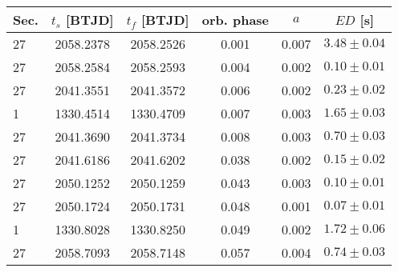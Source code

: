 \begin{tabular}{l|ccccc}
\hline
 Sec. &  $t_s$ [BTJD] &  $t_f$ [BTJD] &  orb. phase &    $a$ &         $ED$ [s] \\
\hline
   27 &     2058.2378 &     2058.2526 &       0.001 &  0.007 &  $3.48 \pm 0.04$ \\
   27 &     2058.2584 &     2058.2593 &       0.004 &  0.002 &  $0.10 \pm 0.01$ \\
   27 &     2041.3551 &     2041.3572 &       0.006 &  0.002 &  $0.23 \pm 0.02$ \\
    1 &     1330.4514 &     1330.4709 &       0.007 &  0.003 &  $1.65 \pm 0.03$ \\
   27 &     2041.3690 &     2041.3734 &       0.008 &  0.003 &  $0.70 \pm 0.03$ \\
   27 &     2041.6186 &     2041.6202 &       0.038 &  0.002 &  $0.15 \pm 0.02$ \\
   27 &     2050.1252 &     2050.1259 &       0.043 &  0.003 &  $0.10 \pm 0.01$ \\
   27 &     2050.1724 &     2050.1731 &       0.048 &  0.001 &  $0.07 \pm 0.01$ \\
    1 &     1330.8028 &     1330.8250 &       0.049 &  0.002 &  $1.72 \pm 0.06$ \\
   27 &     2058.7093 &     2058.7148 &       0.057 &  0.004 &  $0.74 \pm 0.03$ \\
\hline

\end{tabular}
